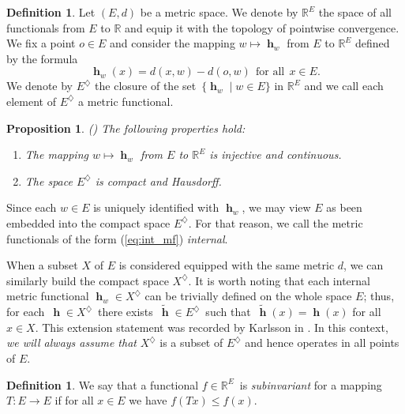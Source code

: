 \documentclass[a4paper,12pt]{article}
\newtheorem{proposition}[theorem]{Proposition}
\theoremstyle{definition}
\newtheorem{definition}[theorem]{Definition}
\numberwithin{equation}{section}
\newcommand{\R}{\mathbb{R}}  %
\numberwithin{equation}{section}
\DeclareMathOperator{\h}{\mathbf{h}} %
\begin{document}
\begin{definition}
Let $(E,d)$ be a metric space. We denote 
by $\R^E$ the space of all functionals from $E$ 
to $\R$ and equip it with the topology of 
pointwise convergence. We fix a point $o\in E$ 
and consider the mapping $w\mapsto \h_w$ 
from $E$ to $\R^E$ defined by the formula
\begin{equation}\label{eq:int_mf}
    \h_w(x) = d(x,w)-d(o,w)\ \ 
    \text{for all}\ \ x\in E. 
\end{equation}
We denote by $E^{\diamondsuit}$ the closure 
of the set
$\,\{\h_w \mid w\in E\}$ in $\R^E$ and we 
call each element of $E^{\diamondsuit}$ a
metric functional. 
\end{definition}


\begin{proposition}
\textup{(\cite[Chapter~3]{GutierrezThesis})}
The following properties hold:
\begin{enumerate}
\item The mapping $w\mapsto\h_w$ from $E$ to 
    $\R^E$ is injective and continuous.
\item The space $E^{\diamondsuit}$ is compact 
    and Hausdorff.     
\end{enumerate}
\end{proposition}

Since each $w\in E$ is uniquely identified 
with $\h_w$, we may view $E$ as been embedded 
into the compact space $E^\diamondsuit$. For
that reason, we call the metric functionals 
of the form (\ref{eq:int_mf}) \emph{internal}. 

When a subset $X$ of $E$ is considered 
equipped with the same metric $d$, we can 
similarly build the compact space 
$X^\diamondsuit$. It is worth noting that 
each internal metric functional 
$\h_w \in X^\diamondsuit$ can be trivially 
defined on the whole space $E$; thus, for 
each $\,\h\in X^\diamondsuit\,$ 
there exists 
$\,\widetilde{\h}\in E^\diamondsuit\,$ such 
that $\,\widetilde{\h}(x)=\h(x)$ for all 
$x\in X$. This extension statement
was recorded by Karlsson in 
\cite{Karlsson2021}. In this context,
{\it we will always assume that}
$X^\diamondsuit$ is a subset of 
$E^\diamondsuit$ and hence operates in all 
points of $E$. 

\begin{definition}  
We say that a functional $f \in \R^E\,$ is 
\emph{subinvariant} for a mapping 
$T: E \to E$ if for all $x \in E$ we have
$f(Tx) \leq f(x)$.
\end{definition}
\end{document}
